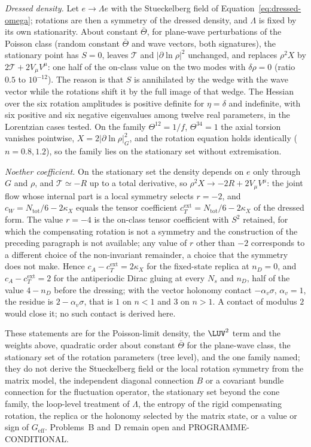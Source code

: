\emph{Dressed density.} Let \(e\to\Lambda e\) with the Stueckelberg field of Equation~\eqref{eq:dressed-omega}; rotations are then a symmetry of the dressed density, and \(\Lambda\) is fixed by its own stationarity. About constant \(\bar\Theta\), for plane-wave perturbations of the Poisson class (random constant \(\bar\Theta\) and wave vectors, both signatures), the stationary point has \(S=0\), leaves \(\mathcal T\) and \(\lvert\partial\ln\rho\rvert^2\) unchanged, and replaces \(\rho^2X\) by \(2\mathcal T+2V_\mu V^\mu\): one half of the on-class value on the two modes with \(\delta\rho=0\) (ratio \(0.5\) to \(10^{-12}\)). The reason is that \(S\) is annihilated by the wedge with the wave vector while the rotations shift it by the full image of that wedge. The Hessian over the six rotation amplitudes is positive definite for \(\eta=\delta\) and indefinite, with six positive and six negative eigenvalues among twelve real parameters, in the Lorentzian cases tested. On the family \(\Theta^{12}=1/f\), \(\Theta^{34}=1\) the axial torsion vanishes pointwise, \(X=2\lvert\partial\ln\rho\rvert^2_G\), and the rotation equation holds identically (\(n=0.8,1.2\)), so the family lies on the stationary set without extremisation.

\emph{Noether coefficient.} On the stationary set the density depends on \(e\) only through \(G\) and \(\rho\), and \(\mathcal T\simeq-R\) up to a total derivative, so \(\rho^2X\to-2R+2V_\mu V^\mu\): the joint flow whose internal part is a local symmetry selects \(r=-2\), and \(c_W=N_{\mathrm{tot}}/6-2\kappa_X\) equals the tensor coefficient \(c_T^{\mathrm{ext}}=N_{\mathrm{tot}}/6-2\kappa_X\) of the dressed form. The value \(r=-4\) is the on-class tensor coefficient with \(S^2\) retained, for which the compensating rotation is not a symmetry and the construction of the preceding paragraph is not available; any value of \(r\) other than \(-2\) corresponds to a different choice of the non-invariant remainder, a choice that the symmetry does not make. Hence \(c_A-c_T^{\mathrm{ext}}=2\kappa_X\) for the fixed-state replica at \(n_D=0\), and \(c_A-c_T^{\mathrm{ext}}=2\) for the antiperiodic Dirac gluing at every \(N_s\) and \(n_D\), half of the value \(4-n_D\) before the dressing; with the vector holonomy contact \(-\alpha_v\sigma\), \(\alpha_v=1\), the residue is \(2-\alpha_v\sigma\), that is \(1\) on \(n<1\) and \(3\) on \(n>1\). A contact of modulus \(2\) would close it; no such contact is derived here.

These statements are for the Poisson-limit density, the \(\LUV^2\) term and the weights above, quadratic order about constant \(\bar\Theta\) for the plane-wave class, the stationary set of the rotation parameters (tree level), and the one family named; they do not derive the Stueckelberg field or the local rotation symmetry from the matrix model, the independent diagonal connection \(B\) or a covariant bundle connection for the fluctuation operator, the stationary set beyond the cone family, the loop-level treatment of \(\Lambda\), the entropy of the rigid compensating rotation, the replica or the holonomy selected by the matrix state, or a value or sign of \(G_{\mathrm{eff}}\). Problems~B and~D remain open and PROGRAMME-CONDITIONAL.
